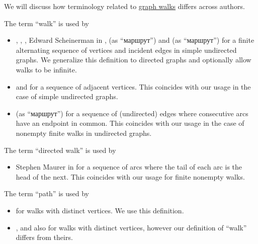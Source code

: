 \begin{remark}\label{rem:graph_walk_terminology}
  We will discuss how terminology related to \hyperref[def:graph_walk]{graph walks} differs across authors.

  \begin{thmenum}
     The term \enquote{walk} is used by
    \begin{itemize}
      \item {}, , , Edward Scheinerman in \cite[572]{Rosen1999},  (as \enquote{маршрут}) and  (as \enquote{маршрут}) for a finite alternating sequence of vertices and incident edges in simple undirected graphs. We generalize this definition to directed graphs and optionally allow walks to be infinite.

      \item {} and  for a sequence of adjacent vertices. This coincides with our usage in the case of simple undirected graphs.

      \item {} (as \enquote{маршрут}) for a sequence of (undirected) edges where consecutive arcs have an endpoint in common. This coincides with our usage in the case of nonempty finite walks in undirected graphs.
    \end{itemize}

     The term \enquote{directed walk} is used by
    \begin{itemize}
      \item Stephen Maurer in \cite[564]{Rosen1999} for a sequence of arcs where the tail of each arc is the head of the next. This coincides with our usage for finite nonempty walks.
    \end{itemize}

     The term \enquote{path} is used by
    \begin{itemize}
      \item {} for walks with distinct vertices. We use this definition.

      \item {},  and  also for walks with distinct vertices, however our definition of \enquote{walk} differs from theirs.


\end{itemize}
\end{thmenum}
\end{remark}
